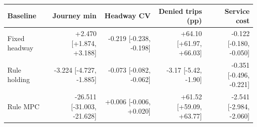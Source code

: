 \begin{tabular}{lrrrr}
\toprule
Baseline & Journey min & Headway CV & Denied trips (pp) & Service cost \\
\midrule
Fixed headway & +2.470 [+1.874, +3.188] & -0.219 [-0.238, -0.198] & +64.10 [+61.97, +66.03] & -0.122 [-0.180, -0.050] \\
Rule holding & -3.224 [-4.727, -1.885] & -0.073 [-0.082, -0.062] & -3.17 [-5.42, -1.90] & -0.351 [-0.496, -0.221] \\
Rule MPC & -26.511 [-31.003, -21.628] & +0.006 [-0.006, +0.020] & +61.52 [+59.09, +63.77] & -2.541 [-2.984, -2.060] \\
\bottomrule
\end{tabular}
